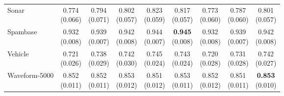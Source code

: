 {\begin{longtable}{lcccccccc}
Sonar & \makecell{0.774\\{\tiny (0.066)}} & \makecell{0.794\\{\tiny (0.071)}} & \makecell{0.802\\{\tiny (0.057)}} & \makecell{0.823\\{\tiny (0.059)}} & \makecell{0.817\\{\tiny (0.057)}} & \makecell{0.773\\{\tiny (0.060)}} & \makecell{0.787\\{\tiny (0.060)}} & \makecell{0.801\\{\tiny (0.057)}} \\
Spambase & \makecell{0.932\\{\tiny (0.008)}} & \makecell{0.939\\{\tiny (0.007)}} & \makecell{0.942\\{\tiny (0.008)}} & \makecell{0.944\\{\tiny (0.007)}} & \makecell{\textbf{0.945}\\{\tiny (0.008)}} & \makecell{0.932\\{\tiny (0.008)}} & \makecell{0.939\\{\tiny (0.007)}} & \makecell{0.942\\{\tiny (0.008)}} \\
Vehicle & \makecell{0.721\\{\tiny (0.026)}} & \makecell{0.738\\{\tiny (0.029)}} & \makecell{0.742\\{\tiny (0.030)}} & \makecell{0.745\\{\tiny (0.024)}} & \makecell{0.743\\{\tiny (0.024)}} & \makecell{0.720\\{\tiny (0.028)}} & \makecell{0.731\\{\tiny (0.028)}} & \makecell{0.742\\{\tiny (0.027)}} \\
Waveform-5000 & \makecell{0.852\\{\tiny (0.011)}} & \makecell{0.852\\{\tiny (0.011)}} & \makecell{0.853\\{\tiny (0.012)}} & \makecell{0.851\\{\tiny (0.012)}} & \makecell{0.853\\{\tiny (0.011)}} & \makecell{0.852\\{\tiny (0.012)}} & \makecell{0.851\\{\tiny (0.011)}} & \makecell{\textbf{0.853}\\{\tiny (0.010)}} \\
\bottomrule
\end{longtable}}


